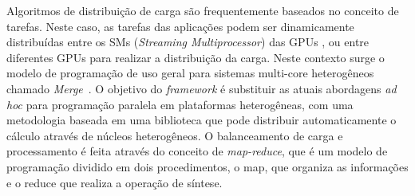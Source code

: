 Algoritmos de distribuição de carga são frequentemente baseados no conceito de tarefas. Neste caso, as tarefas das aplicações podem ser dinamicamente distribuídas entre os SMs (\textit{Streaming Multiprocessor}) das GPUs \citep{dynamicLoad}, ou entre diferentes GPUs \citep{starpu} para realizar a distribuição da carga. Neste contexto surge o modelo de programação de uso geral para sistemas multi-core heterogêneos chamado \textit{Merge}~\citep{merge}. O objetivo do \textit{framework} é substituir as atuais abordagens \textit{ad hoc} para programação paralela em plataformas heterogêneas, com uma metodologia baseada em uma biblioteca que pode distribuir automaticamente o cálculo através de núcleos heterogêneos. O balanceamento de carga e processamento é feita através do conceito de \textit{map-reduce}, que é um modelo de programação dividido em dois procedimentos, o map, que organiza as informações e o reduce que realiza a operação de síntese. 





